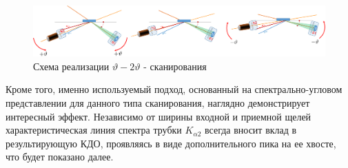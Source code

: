  \begin{figure}[H]
   \centering
   \includegraphics[width=1\textwidth]{images/theta_2theta_scan.png}
   \caption{Схема реализации $\vartheta - 2\vartheta$ - сканирования}
   \label{ris:theta_2theta_scan}
 \end{figure}

Кроме того, именно используемый подход, основанный на спектрально-угловом представлении
для данного типа сканирования, наглядно демонстрирует интересный эффект.
 Независимо от ширины входной и приемной щелей характеристическая линия спектра
 трубки $K_{\alpha 2}$ всегда вносит вклад в результирующую КДО, проявляясь в виде дополнительного
 пика на ее хвосте, что будет показано далее.
